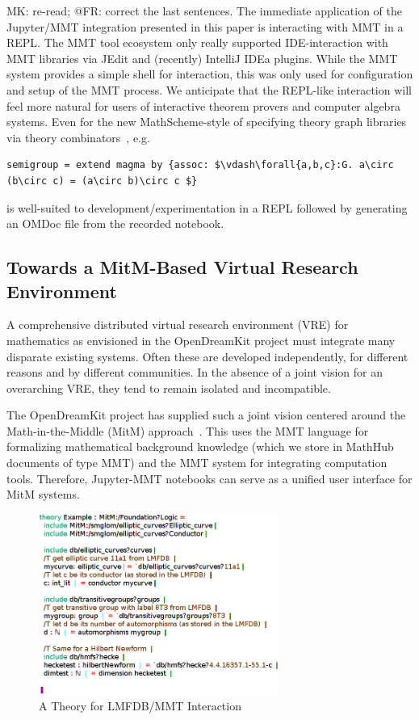 \begin{newpart}{MK: re-read; @FR: correct the last sentences.}
  The immediate application of the Jupyter/MMT integration presented in this paper is interacting with MMT in a REPL.
  The MMT tool ecosystem only really supported IDE-interaction with MMT libraries via JEdit and (recently) IntelliJ IDEa plugins. 
  While the MMT system provides a simple shell for interaction, this was only used for configuration and setup of the MMT process.
  We anticipate that the REPL-like interaction will feel more natural for users of interactive theorem provers and computer algebra systems.
  Even for the new MathScheme-style of specifying theory graph libraries via theory combinators~\cite{RabSha:????19}, e.g. 
\begin{lstlisting}[mathescape]
semigroup = extend magma by {assoc: $\vdash\forall{a,b,c}:G. a\circ (b\circ c) = (a\circ b)\circ c $}
\end{lstlisting}
  is well-suited to development/experimentation in a REPL followed by generating an OMDoc file from the recorded notebook.  
\end{newpart}

\subsection{Towards a MitM-Based Virtual Research Environment}


A comprehensive distributed virtual research environment (VRE) for mathematics as envisioned in the OpenDreamKit project must integrate many disparate existing systems.
Often these are developed independently, for different reasons and by different communities.
In the absence of a joint vision for an overarching VRE, they tend to remain isolated and incompatible.

The OpenDreamKit project has supplied such a joint vision centered around the Math-in-the-Middle (MitM) approach~\cite{DehKohKon:iop16}.
This uses the MMT language for formalizing mathematical background knowledge (which we store in MathHub documents of type MMT) and the MMT system for integrating computation tools.
Therefore, Jupyter-MMT notebooks can serve as a unified user interface for MitM systems.

\begin{figure}[ht]\centering
  \includegraphics[width=0.7\textwidth]{../D4.11/hecke}
  \caption{A Theory for LMFDB/MMT Interaction}\label{fig:hecke}
\end{figure}

